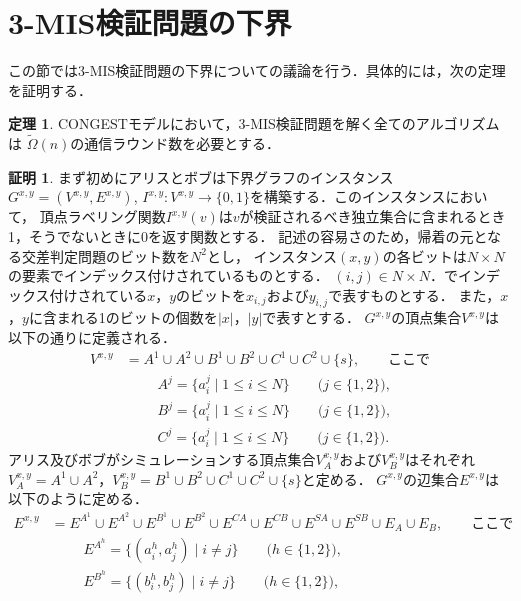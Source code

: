 \documentclass[12pt]{thesis}
\newcommand{\CONGEST}{\textsf{CONGEST}}
\theoremstyle{definition}
\newtheorem{theorem}{定理}[chapter]
\newtheorem*{prf*}{証明}
\begin{document}
\section{3-MIS検証問題の下界}
この節では3-MIS検証問題の下界についての議論を行う．具体的には，次の定理を証明する．
\begin{theorem}
{\CONGEST}モデルにおいて，3-MIS検証問題を解く全てのアルゴリズムは
$\tilde{\Omega} (n)$の通信ラウンド数を必要とする．
\end{theorem}
\begin{prf*}
まず初めにアリスとボブは下界グラフのインスタンス$G^{x,y} = (V^{x,y}, E^{x,y})$, 
$I^{x,y} : V^{x,y} \to \{0, 1\}$を構築する．このインスタンスにおいて，
頂点ラベリング関数$I^{x,y}(v)$は$v$が検証されるべき独立集合に含まれるとき1，そうでないときに0を返す関数とする．
記述の容易さのため，帰着の元となる交差判定問題のビット数を$N^2$とし，
インスタンス$(x, y)$の各ビットは$N\times N$の要素でインデックス付けされているものとする．
$(i, j) \in N \times N$．でインデックス付けされている$x$，$y$のビットを$x_{i,j}$および$y_{i,j}$で表すものとする．
また，$x$，$y$に含まれる1のビットの個数を$|x|$，$|y|$で表すとする．
$G^{x,y}$の頂点集合$V^{x,y}$は以下の通りに定義される．
\begin{align*}
V^{x,y} &= A^{1} \cup A^{2} \cup B^{1} \cup B^{2} \cup C^{1} \cup C^{2} \cup \{s\}, \quad \quad \text{ここで}\\
&\phantom{=} \quad A^{j} = \{a^{j}_{i} \mid 1\leq i \leq N\} \quad \quad \text{($j \in \{1, 2\}$)}, \\
&\phantom{=} \quad B^{j} = \{a^{j}_{i} \mid 1\leq i \leq N\} \quad \quad \text{($j \in \{1, 2\}$)}, \\
&\phantom{=} \quad C^{j} = \{a^{j}_{i} \mid 1\leq i \leq N\} \quad \quad \text{($j \in \{1, 2\}$)}.
\end{align*}
アリス及びボブがシミュレーションする頂点集合$V^{x,y}_{A}$および$V^{x,y}_{B}$はそれぞれ
$V^{x,y}_{A} = A^{1} \cup A^{2}$，$V^{x,y}_{B} = B^{1} \cup B^{2} \cup C^{1} \cup C^{2} \cup \{s\}$と定める．
$G^{x,y}$の辺集合$E^{x,y}$は以下のように定める．
\begin{align*}
E^{x,y} &= E^{A^{1}} \cup E^{A^{2}} \cup E^{B^{1}} \cup E^{B^{2}} 
\cup E^{CA} \cup E^{CB} \cup E^{SA} \cup E^{SB} \cup E_{A} \cup E_{B}, \quad \quad \text{ここで}\\
&\phantom{=} \quad E^{A^{h}} = \{(a^{h}_{i}, a^{h}_{j})  \mid i \neq j\} \quad \quad \text{($h \in \{1, 2\}$)}, \\
&\phantom{=} \quad E^{B^{h}} = \{(b^{h}_{i}, b^{h}_{j})  \mid i \neq j\} \quad \quad \text{($h \in \{1, 2\}$)}, \\

\end{align*}
\end{prf*}
\end{document}
